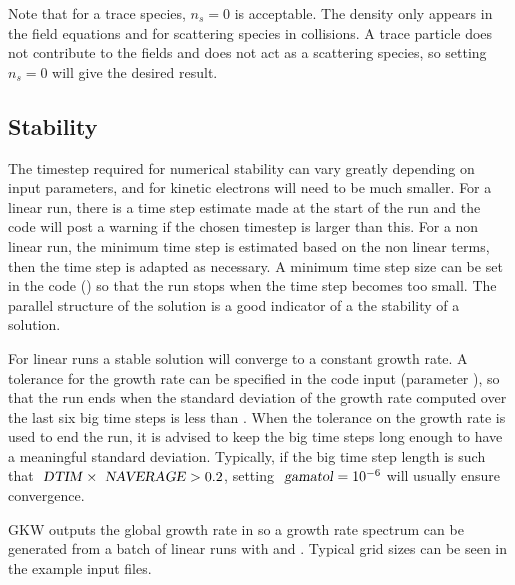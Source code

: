 Note that for a trace species, $n_s=0$ is acceptable. The density only appears in the field equations and for scattering species in collisions.  A trace particle does not contribute to the fields and does not act as a scattering species, so setting $n_s=0$ will give the desired result.

\subsection{Stability}
The timestep required for numerical stability can vary greatly depending on input parameters, and for kinetic electrons will need to be much smaller.
For a linear run, there is a time step estimate made at the start of the run and the code will post a warning if
the chosen timestep is larger than this. For a non linear run, the minimum time step is estimated based on the
non linear terms, then the time step is adapted as necessary. A minimum time step size can be set in the code () so
that the run stops when the time step becomes too small. The parallel structure of the solution is a good
indicator of a the stability of a solution. 

For linear runs a stable solution will converge to a constant growth rate. A tolerance for the growth rate can be
specified in the code input (parameter ), so that the run ends when the standard deviation of the growth rate computed over the last six big time steps is less than . When the tolerance on the growth rate is used to end the run, it is advised to keep the big time steps long enough to have a meaningful standard deviation. Typically, if the big time step length is such that $\name{DTIM}\times\name{NAVERAGE}>0.2$, setting $\name{gamatol}=10^{-6}$ will usually ensure convergence.  


GKW outputs the global growth rate
in  so a growth rate spectrum can be generated from a batch of linear runs with 
 and .  Typical grid sizes can be seen in the example input files.

